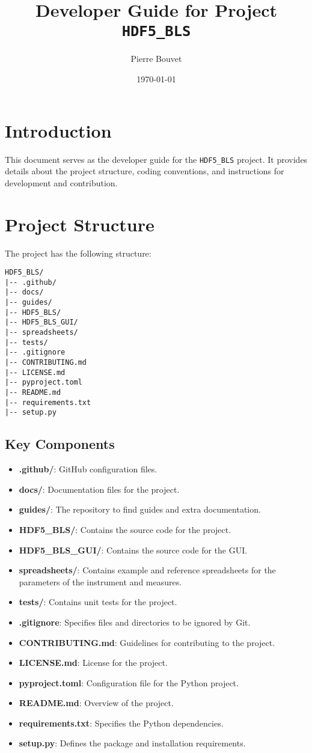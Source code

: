 \documentclass[a4paper,12pt]{article}
\title{Developer Guide for Project \texttt{HDF5\_BLS}}
\author{Pierre Bouvet}
\date{\today}
\begin{document}
\maketitle

\section{Introduction}
This document serves as the developer guide for the \texttt{HDF5\_BLS} project. It provides details about the project structure, coding conventions, and instructions for development and contribution.

\section{Project Structure}
The project has the following structure:
\begin{verbatim}
HDF5_BLS/
|-- .github/
|-- docs/
|-- guides/
|-- HDF5_BLS/
|-- HDF5_BLS_GUI/
|-- spreadsheets/
|-- tests/
|-- .gitignore
|-- CONTRIBUTING.md
|-- LICENSE.md
|-- pyproject.toml
|-- README.md
|-- requirements.txt
|-- setup.py
\end{verbatim}

\subsection{Key Components}
\begin{itemize}
    \item \textbf{.github/}: GitHub configuration files.
    \item \textbf{docs/}: Documentation files for the project.
    \item \textbf{guides/}: The repository to find guides and extra documentation.
    \item \textbf{HDF5\_BLS/}: Contains the source code for the project.
    \item \textbf{HDF5\_BLS\_GUI/}: Contains the source code for the GUI.
    \item \textbf{spreadsheets/}: Contains example and reference spreadsheets for the parameters of the instrument and measures.
    \item \textbf{tests/}: Contains unit tests for the project.
    \item \textbf{.gitignore}: Specifies files and directories to be ignored by Git.
    \item \textbf{CONTRIBUTING.md}: Guidelines for contributing to the project.
    \item \textbf{LICENSE.md}: License for the project.
    \item \textbf{pyproject.toml}: Configuration file for the Python project.
    \item \textbf{README.md}: Overview of the project.
    \item \textbf{requirements.txt}: Specifies the Python dependencies.
    \item \textbf{setup.py}: Defines the package and installation requirements.
\end{itemize}
\end{document}
